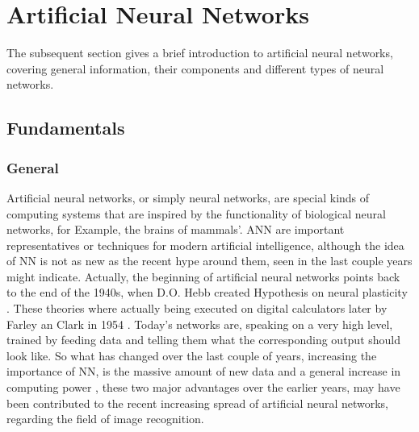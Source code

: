 \chapter{Artificial Neural Networks}\label{chapter:Artificial Neural Networks}
The subsequent section gives a brief introduction to artificial neural networks, covering general information, their components and different types of neural networks.

\section{Fundamentals}
\subsection{General}
Artificial neural networks, or simply neural networks, are special kinds of computing systems that are inspired by the functionality of biological neural networks, for Example, the brains of mammals'. ANN are important representatives or techniques for modern artificial intelligence, although the idea of NN is not as new as the recent hype around them, seen in the last couple years might indicate. Actually, the beginning of artificial neural networks points back to the end of the 1940s, when D.O. Hebb created Hypothesis on neural plasticity \cite{hebb}. These theories where actually being executed on digital calculators later by Farley an Clark in 1954 \cite{farleyclark}. Today's networks are, speaking on a very high level,  trained by feeding data and telling them what the corresponding output should look like. \newline
So what has changed over the last couple of years, increasing the importance of NN, is the massive amount of new data and a general increase in computing power \cite{moore}, these two major advantages over the earlier years, may have been contributed to the recent increasing spread of artificial neural networks, regarding the field of image recognition.

